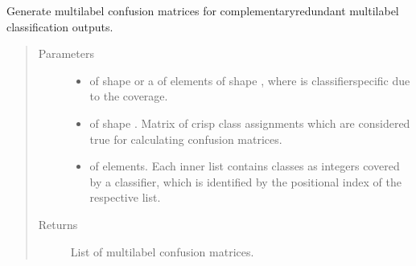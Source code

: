 \documentclass[letterpaper,10pt,english]{sphinxmanual}
\begin{document}
\begin{fulllineitems}
\label{\detokenize{pusion.util.generator:pusion.util.generator.generate_multilabel_cr_confusion_matrices}}
\sphinxAtStartPar
Generate multilabel confusion matrices for complementary\sphinxhyphen{}redundant multilabel classification outputs.
\begin{quote}\begin{description}
\item[{Parameters}] \leavevmode\begin{itemize}
\item {} 
\sphinxAtStartPar
{} \textendash{}  of shape  or a  of
 elements of shape , where  is classifier\sphinxhyphen{}specific
due to the coverage.

\item {} 
\sphinxAtStartPar
{} \textendash{}  of shape .
Matrix of crisp class assignments which are considered true for calculating confusion matrices.

\item {} 
\sphinxAtStartPar
{} \textendash{}  of  elements. Each inner list contains classes as integers covered by a classifier,
which is identified by the positional index of the respective list.

\end{itemize}

\item[{Returns}] \leavevmode
\sphinxAtStartPar
List of multilabel confusion matrices.

\end{description}\end{quote}

\end{fulllineitems}

\end{document}
